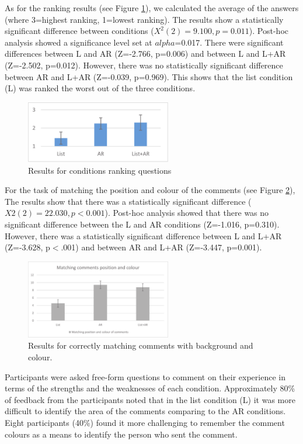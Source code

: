 As for the ranking results (see Figure \ref{fig:mgia16:ranking}), we calculated the average of the answers (where 3=highest ranking, 1=lowest ranking). The results show a statistically significant difference between conditions ($X^2(2)=9.100, p=0.011$). Post-hoc analysis showed a significance level set at $alpha$=0.017. There were significant differences between L and AR (Z=-2.766, p=0.006) and between L and L+AR (Z=-2.502, p=0.012). However, there was no statistically significant difference between AR and L+AR (Z=-0.039, p=0.969). This shows that the list condition (L) was ranked the worst out of the three conditions.

\begin{figure}[ht]
  \centering
  \includegraphics[width=2.5in]{images/mgia16/ranking.eps}
  \caption{Results for conditions ranking questions}
	\label{fig:mgia16:ranking}
\end{figure}

For the task of matching the position and colour of the comments (see Figure \ref{fig:mgia16:questions_matching}), The results show that there was a statistically significant difference ($X2(2)=22.030, p<0.001$). Post-hoc analysis showed that there was no significant difference between the L and AR conditions (Z=-1.016, p=0.310). However, there was a statistically significant difference between L and L+AR (Z=-3.628, p$<$.001) and between AR and L+AR (Z=-3.447, p=0.001).

\begin{figure}[ht]
  \centering
  \includegraphics[width=2.5in]{images/mgia16/matching.eps}
  \caption{Results for correctly matching comments with background and colour.}
	\label{fig:mgia16:questions_matching}
\end{figure}

Participants were asked free-form questions to comment on their experience in terms of the strengths and the weaknesses of each condition. Approximately 80\% of feedback from the participants noted that in the list condition (L) it was more difficult to identify the area of the comments comparing to the AR conditions. Eight participants (40\%) found it more challenging to remember the comment colours as a means to identify the person who sent the comment. 

